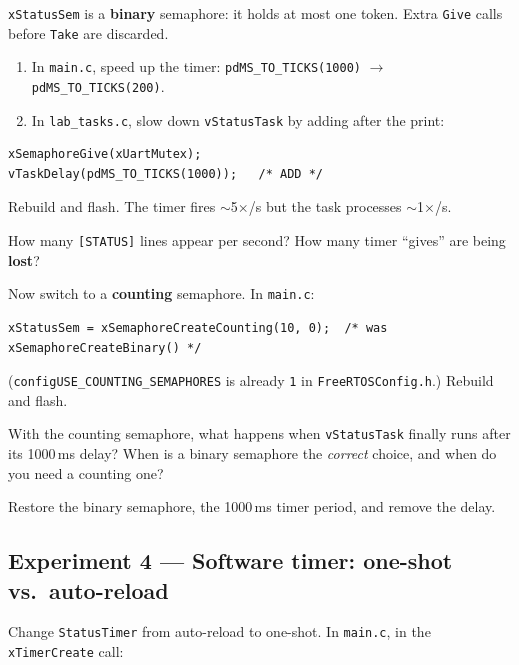 \documentclass[11pt, a4paper]{article}
\newcommand{\file}[1]{\texttt{\small #1}}
\newcommand{\api}[1]{\texttt{\small #1}}
\begin{document}
\api{xStatusSem} is a \textbf{binary} semaphore: it holds at most one token.
Extra \api{Give} calls before \api{Take} are discarded.

\begin{enumerate}[noitemsep, leftmargin=*]
  \item In \file{main.c}, speed up the timer:
        \api{pdMS\_TO\_TICKS(1000)} $\to$ \api{pdMS\_TO\_TICKS(200)}.
  \item In \file{lab\_tasks.c}, slow down \texttt{vStatusTask} by adding after the print:
\end{enumerate}

\begin{lstlisting}[style=cstyle]
xSemaphoreGive(xUartMutex);
vTaskDelay(pdMS_TO_TICKS(1000));   /* ADD */
\end{lstlisting}

Rebuild and flash.  The timer fires $\sim$5$\times$/s but the task processes
$\sim$1$\times$/s.

\begin{questionbox}[~3a]
  How many \texttt{[STATUS]} lines appear per second?  How many timer ``gives'' are
  being \textbf{lost}?
\end{questionbox}

Now switch to a \textbf{counting} semaphore.  In \file{main.c}:

\begin{lstlisting}[style=cstyle]
xStatusSem = xSemaphoreCreateCounting(10, 0);  /* was xSemaphoreCreateBinary() */
\end{lstlisting}

(\texttt{configUSE\_COUNTING\_SEMAPHORES} is already \texttt{1} in
\file{FreeRTOSConfig.h}.)  Rebuild and flash.

\begin{questionbox}[~3b]
  With the counting semaphore, what happens when \texttt{vStatusTask} finally runs
  after its 1000\,ms delay?  When is a binary semaphore the \emph{correct} choice,
  and when do you need a counting one?
\end{questionbox}

Restore the binary semaphore, the 1000\,ms timer period, and remove the delay.

\subsection{Experiment 4 --- Software timer: one-shot vs.\ auto-reload}

Change \texttt{StatusTimer} from auto-reload to one-shot.
In \file{main.c}, in the \api{xTimerCreate} call:
\end{document}
